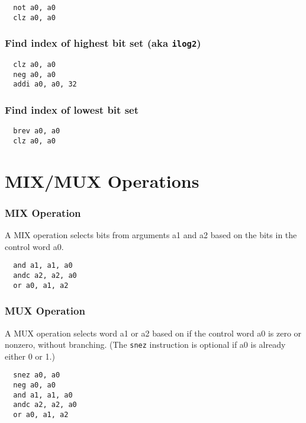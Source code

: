 \begin{verbatim}
  not a0, a0
  clz a0, a0
\end{verbatim}

\subsubsection{Find index of highest bit set (aka \texttt{ilog2})}

\begin{verbatim}
  clz a0, a0
  neg a0, a0
  addi a0, a0, 32
\end{verbatim}

\subsubsection{Find index of lowest bit set}

\begin{verbatim}
  brev a0, a0
  clz a0, a0
\end{verbatim}

\section{MIX/MUX Operations}

\subsubsection{MIX Operation}

A MIX operation selects bits from arguments a1 and a2 based on the bits in
the control word a0.

\begin{verbatim}
  and a1, a1, a0
  andc a2, a2, a0
  or a0, a1, a2
\end{verbatim}

\subsubsection{MUX Operation}

A MUX operation selects word a1 or a2 based on if the control word a0 is
zero or nonzero, without branching. (The {\tt snez} instruction is optional
if a0 is already either 0 or 1.)

\begin{verbatim}
  snez a0, a0
  neg a0, a0
  and a1, a1, a0
  andc a2, a2, a0
  or a0, a1, a2
\end{verbatim}

